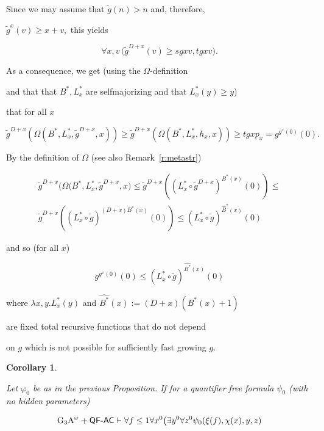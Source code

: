 \documentclass[1p]{elsarticle}
\newcommand{\usftext}[1]{\textsf{\upshape #1}}
\newcommand{\ba}{\begin{array}} \newcommand{\ea}{\end{array}}
\newcommand{\QF}{\ensuremath{\usftext{QF}}}
\newcommand{\AC}{\ensuremath{\usftext{AC}}}
\newcommand{\m}{\ensuremath{\usftext{-}}}
\theoremstyle{plain}
\newtheorem{cor}[thm]{Corollary}
\theoremstyle{definition}
\theoremstyle{remark}
\renewenvironment{proof}[1][]{\noindent{\bf Proof{#1}. }}{\nopagebreak[4]{\hspace*{\fill}


  $\Box$              %

 }{\vspace{2ex}}}
\renewcommand{\phi}{\varphi}
\theoremstyle{definition}
\begin{document}
{\begin{proof}
Since we may assume that $\tilde{g}(n)>n$ and, therefore, 

$\tilde{g}^x(v)\ge x+v,$ this yields 

\[ \forall x,v\,\big( \tilde{g}^{D+x}(v)\ge sgxv,tgxv\big). \]

As a consequence, we get (using the $\Omega$-definition 

and that that $B^*,L^*_x$ are selfmajorizing and that $L^*_x(y)\ge y$) 

that for all $x$  

\[ \tilde{g}^{D+x}\left(\Omega(B^*,L^*_x,\tilde{g}^{D+x},x)\right) \ge 

\tilde{g}^{D+x}\left(\Omega(B^*,L^*_x,h_x,x)\right) \ge 

tgxp_x=g^{g^x(0)}(0). \]

By the definition of $\Omega$ (see also Remark~\ref{r:metastr}) 

\[   \ba{l} \tilde{g}^{D+x}\big(\Omega(B^*,L^*_x,\tilde{g}^{D+x},x\big)\le 

\tilde{g}^{D+x}

\left((L^*_x\circ\tilde{g}^{D+x})^{B^*(x)}(0)\right) \le \\ 

\tilde{g}^{D+x}\left((L^*_x\circ\tilde{g})^{(D+x)B^*(x)}(0)\right)\le 

(L^*_x\circ \tilde{g})^{\widehat{B}^*(x)}(0)\ea \] 

and so (for all $x$)

\[  g^{g^x(0)}(0)\le (L^*_x\circ \tilde{g})^{\widehat{B^*}(x)}(0) \]

where $\lambda x,y.L^*_x(y)$ and $\widehat{B^*}(x):=(D+x)(B^*(x)+1)$ 

are fixed total recursive functions that do not depend 

on $g$ which is not possible for sufficiently fast growing $g$.

\end{proof}



\begin{cor}\label{c:anyStrongerPhi}

Let $\phi_0$ be as in the previous Proposition. If for a quantifier free formula $\psi_0$ (with no hidden parameters)

\[

\mbox{\rm G$_3$A}^\omega+\QF\m\AC 

\vdash \forall f\leq 1 \forall x^0\big( \exists y^0\forall z^0 \psi_0(\xi(f),\chi(x),y,z)

\]
\end{cor}}
\end{document}
